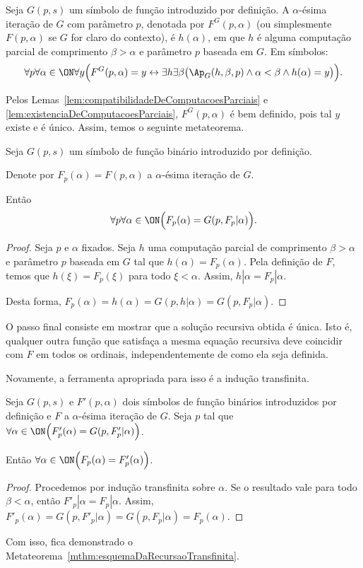 \begin{definition}[$\ZFmPI$]\label{def:iteracaoTransfinita}
    Seja $G(p, s)$ um símbolo de função introduzido por definição.
    A $\alpha$-ésima iteração de $G$ com parâmetro $p$, denotada por $F^G(p, \alpha)$ (ou simplesmente $F(p, \alpha)$ se $G$ for claro do contexto), é $h(\alpha)$, em que $h$ é alguma computação parcial de comprimento $\beta>\alpha$ e parâmetro $p$ baseada em $G$.
    Em símbolos:
    \[
        \forall p\forall \alpha\in\ON\forall y
        \Bigl(F^G(p,\alpha)=y \leftrightarrow
        \exists h\exists \beta\bigl(\Ap_G(h,\beta,p)\land \alpha<\beta \land h(\alpha)=y\bigr)\Bigr).
    \]
\end{definition}
Pelos Lemas~\ref{lem:compatibilidadeDeComputacoesParciais} e \ref{lem:existenciaDeComputacoesParciais}, $F^G(p, \alpha)$ é bem definido, pois tal $y$ existe e é único.
Assim, temos o seguinte metateorema.
\begin{theorem}[$\ZFmPI$]\label{thm:equacaoDaIteracaoTransfinita}
    Seja $G(p, s)$ um símbolo de função binário introduzido por definição.

    Denote por $F_p(\alpha)=F(p, \alpha)$ a $\alpha$-ésima iteração de $G$.

    Então
    \[
        \forall p \forall \alpha \in \ON \Bigl( F_p(\alpha)=G(p, F_p|\alpha)\Bigr).
    \]
\end{theorem}
\begin{proof}
    Seja $p$ e $\alpha$ fixados.
    Seja $h$ uma computação parcial de comprimento $\beta>\alpha$ e parâmetro $p$ baseada em $G$ tal que $h(\alpha)=F_p(\alpha)$.
    Pela definição de $F$, temos que $h(\xi)=F_p(\xi)$ para todo $\xi <\alpha$.
    Assim, $h|\alpha=F_p|\alpha$.

    Desta forma, $F_p(\alpha)=h(\alpha)=G(p, h|\alpha)=G(p, F_p|\alpha)$.
\end{proof}
O passo final consiste em mostrar que a solução recursiva obtida é única.
Isto é, qualquer outra função que satisfaça a mesma equação recursiva deve coincidir com $F$ em todos os ordinais, independentemente de como ela seja definida.

Novamente, a ferramenta apropriada para isso é a indução transfinita.
\begin{theorem}[$\ZFmPI$]\label{thm:unicidadeDaIteracaoTransfinita}
    Seja $G(p, s)$ e $F'(p, \alpha)$ dois símbolos de função binários introduzidos por definição e $F$ a $\alpha$-ésima iteração de $G$.
    Seja $p$ tal que $\forall \alpha \in \ON \Bigl( F'_p(\alpha)=G(p, F'_p  |\alpha)\Bigr)$.

    Então $\forall \alpha \in \ON \Bigl( F_p(\alpha)=F'_p(\alpha)\Bigr)$.
\end{theorem}
\begin{proof}
    Procedemos por indução transfinita sobre $\alpha$.
    Se o resultado vale para todo $\beta <\alpha$, então $F'_p|\alpha=F_p|\alpha$.
    Assim, $F'_p(\alpha)=G(p, F'_p|\alpha)=G(p, F_p|\alpha)=F_p(\alpha)$.
\end{proof}
Com isso, fica demonstrado o Metateorema~\ref{mthm:esquemaDaRecursaoTransfinita}.


